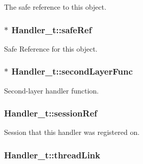 The safe reference to this object. 

\subsubsection[{\texorpdfstring{safe\+Ref}{safeRef}}]{$\ast$ Handler\+\_\+t\+::safe\+Ref}\hypertarget{struct_handler__t_a93b53674f973a349f29839c50934ddd5}{}\label{struct_handler__t_a93b53674f973a349f29839c50934ddd5}


Safe Reference for this object. 

\subsubsection[{\texorpdfstring{second\+Layer\+Func}{secondLayerFunc}}]{$\ast$ Handler\+\_\+t\+::second\+Layer\+Func}\hypertarget{struct_handler__t_abbac75568cc8738ec575ad636389558a}{}\label{struct_handler__t_abbac75568cc8738ec575ad636389558a}


Second-\/layer handler function. 

\subsubsection[{\texorpdfstring{session\+Ref}{sessionRef}}]{ Handler\+\_\+t\+::session\+Ref}\hypertarget{struct_handler__t_a8babaf56a3e0e02a82f034eee99747d8}{}\label{struct_handler__t_a8babaf56a3e0e02a82f034eee99747d8}


Session that this handler was registered on. 

\subsubsection[{\texorpdfstring{thread\+Link}{threadLink}}]{ Handler\+\_\+t\+::thread\+Link}\hypertarget{struct_handler__t_a06ce7b40aa5d8eb342c07c8f7ccb515e}{}\label{struct_handler__t_a06ce7b40aa5d8eb342c07c8f7ccb515e}


